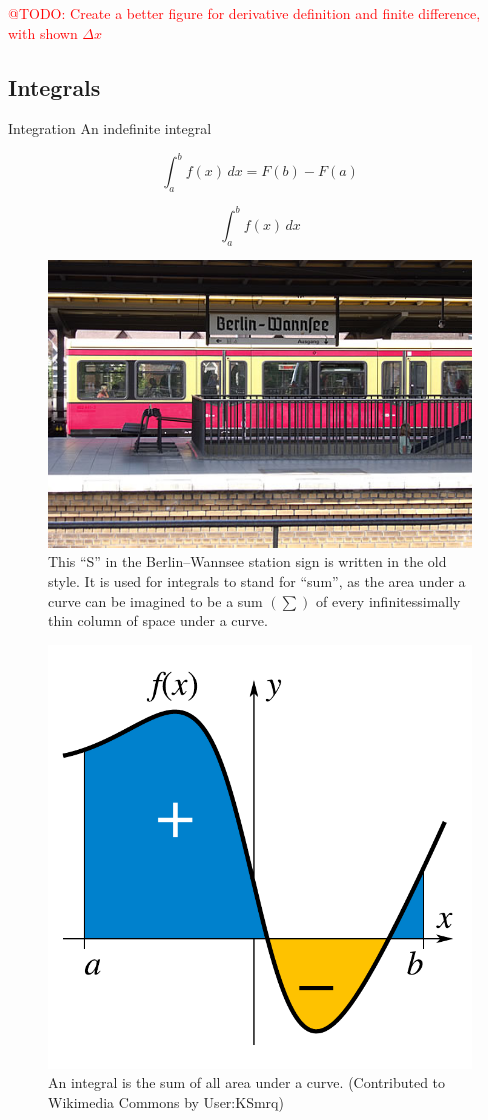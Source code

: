 \documentclass[a4paper,10pt]{scrartcl}
\makeatletter
\newcommand{\todo}[1]{\textcolor{red}{@TODO: #1}}
\makeatother
\begin{document}
\todo{Create a better figure for derivative definition and finite difference, with shown $\Delta x$}

\subsection{Integrals}

Integration 
An indefinite integral 



\begin{equation}
\int_a^b \! f(x)\,dx = F(b) - F(a)
\end{equation}

\begin{equation}
\int_a^b \! f(x)\,dx
\end{equation}

\begin{figure}[!ht]
\begin{center}
\includegraphics[width=.5\linewidth]{figures/NumericalAndMath/BerlinWannsee.jpg}
\end{center}
\caption{This ``S'' in the Berlin--Wannsee station sign is written in the old style. It is used for integrals to stand for ``sum'', as the area under a curve can be imagined to be a sum $\left( \sum \right)$ of every infinitessimally thin column of space under a curve.}
\end{figure}

\begin{figure}[!ht]
\begin{center}
\includegraphics[width=.5\linewidth]{figures/NumericalAndMath/IntegralExample.pdf}
\end{center}
\caption{An integral is the sum of all area under a curve. (Contributed to Wikimedia Commons by User:KSmrq)}
\end{figure}
\end{document}
